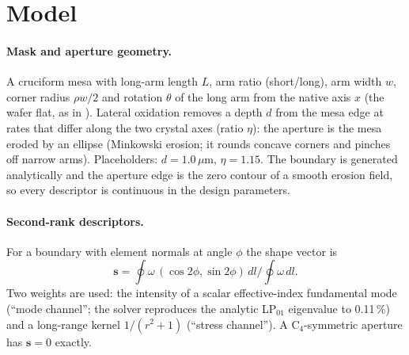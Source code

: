 \documentclass[10pt]{article}
\begin{document}
\section{Model}\label{sec:model}
\paragraph{Mask and aperture geometry.} A cruciform mesa with long-arm length $L$, arm ratio (short/long), arm width $w$, corner radius $\rho w/2$ and rotation $\theta$ of the long arm from the native axis $x$
(the wafer flat, as in \cite{yuan2025mesa}). Lateral oxidation removes a depth $d$ from the mesa edge at rates that differ along the two crystal axes (ratio $\eta$): the aperture is the mesa eroded by an ellipse
(Minkowski erosion; it rounds concave corners and pinches off narrow arms). Placeholders: $d=1.0\,\mu$m, $\eta=1.15$. The boundary is generated analytically and the aperture edge is the zero contour of a smooth erosion field, so every descriptor is
continuous in the design parameters.
\paragraph{Second-rank descriptors.} For a boundary with element normals at angle $\phi$ the shape vector is
\begin{equation*}\mathbf s=\oint\omega\,(\cos2\phi,\sin2\phi)\,dl\Big/\oint\omega\,dl.\end{equation*}
Two weights are used: the intensity of a scalar effective-index fundamental mode
(``mode channel''; the solver reproduces the analytic LP$_{01}$ eigenvalue to 0.11\,\%) and a long-range kernel $1/(r^2+1)$ (``stress channel''). A C$_4$-symmetric aperture has $\mathbf s=0$ exactly.
\end{document}
